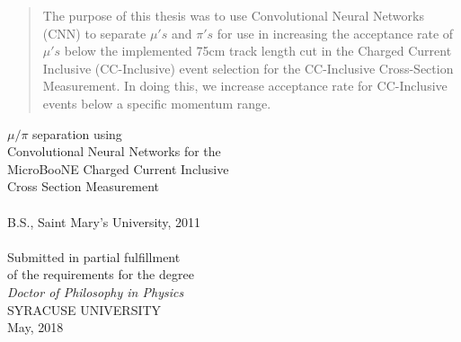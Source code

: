 \documentclass[hyperpdf,oneside,bindnopdf,usenames,dvipsnames,svgnames,table,longbibliography]{hepthesis}
\begin{document}
\begin{frontmatter}

  \thispagestyle{empty}
  \let\cleardoublepage\clearpage
\begin{abstract}%
  \thispagestyle{empty}
The purpose of this thesis was to use Convolutional Neural Networks (CNN) to separate $\mu'{s}$ and $\pi'{s}$ for use in increasing the acceptance rate of $\mu'{s}$ below the implemented 75cm track length cut in the Charged Current Inclusive (CC-Inclusive) event selection for the CC-Inclusive Cross-Section Measurement. In doing this, we increase acceptance rate for CC-Inclusive events below a specific momentum range.
\end{abstract}
\let\cleardoublepage\clearpage
\newpage

\begin{center}
\vspace*{0.2cm}
\noindent\makebox[\linewidth]{\rule{\textwidth}{0.3pt}}
{\huge %
$\mu/\pi$ separation using \\Convolutional Neural Networks for the \\MicroBooNE Charged Current Inclusive \\Cross Section Measurement 
}
\noindent\makebox[\linewidth]{\rule{\textwidth}{0.3pt}}\\ %
\vspace{0.5cm}
\vspace{0.6cm}
\\[6pt]
B.S., Saint Mary's University, 2011\\
\vspace{1.6cm}
\\[6pt]
Submitted in partial fulfillment\\
of the requirements for the degree\\
\emph{Doctor of Philosophy in Physics}\\

{
\vspace{1.5cm}
}
SYRACUSE UNIVERSITY\\ 
May, 2018\\


\end{center}
\end{frontmatter}
\end{document}
